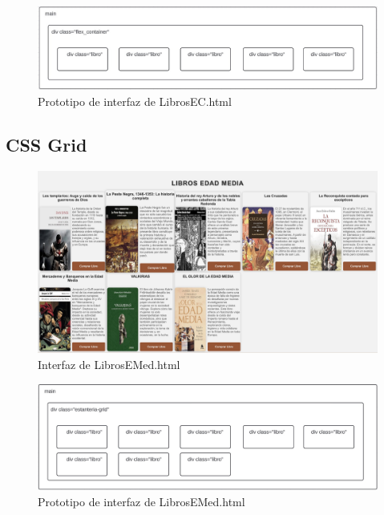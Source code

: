 \documentclass{article}
\begin{document}
\begin{figure}[H]
    \centering
    \includegraphics[width=1\textwidth]{cssFotos/flexContainerEsquema.jpg}
    \caption{Prototipo de interfaz de LibrosEC.html}
    \label{fig:prototipo_foro}
\end{figure}

\subsection{CSS Grid}

\begin{figure}[H]
    \centering
    \includegraphics[width=1\textwidth]{cssFotos/cssgrid.jpg}
    \caption{Interfaz de LibrosEMed.html}
    \label{fig:foro_interface}
\end{figure}

\begin{figure}[H]
    \centering
    \includegraphics[width=1\textwidth]{cssFotos/cssgridEsquema.jpg}
    \caption{Prototipo de interfaz de LibrosEMed.html}
    \label{fig:prototipo_foro}
\end{figure}
\end{document}
